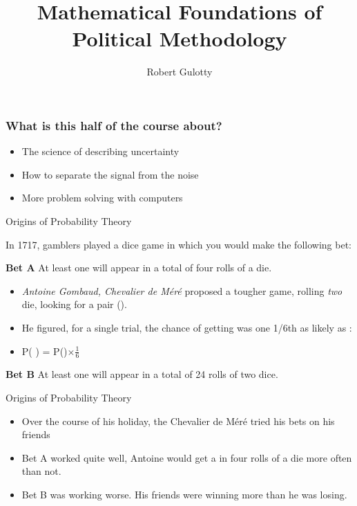 \documentclass[handout]{beamer}
\title[PLSC 43401]{Mathematical Foundations of Political Methodology}
\author{Robert Gulotty}
\institute[Chicago]{University of Chicago}
\def\die#1{{\domino#1}}
\numberwithin{equation}{section}
\begin{document}
\begin{frame}
\maketitle
\end{frame}
\begin{frame}
\frametitle{What is this half of the course about?}
\begin{itemize}
\item The science of describing uncertainty
\item How to separate the signal from the noise
\item More problem solving with computers
\end{itemize}
\end{frame}






\begin{frame}{Origins of Probability Theory}

In 1717, gamblers played a dice game in which you would make the following bet:
\begin{tcolorbox}
\textbf{Bet A} At least one \die1 will appear in a total of four rolls of a die.\\
\end{tcolorbox}
\pause
\begin{itemize}
\item \emph{Antoine Gombaud, Chevalier de M\'{e}r\'{e}} proposed a tougher game, rolling \emph{two} die, looking for a pair (\die1\die1).\\
\pause
\item He figured, for a single trial, the chance of getting \die1\die1 was one 1/6th as likely as \die1 : \pause
\item[$\rightarrow$] P( \die1\die1) =  P(\die1)$\times\frac{1}{6}$
\pause
  
\end{itemize}
\begin{tcolorbox}
\textbf{Bet B}  At least one \die1\die1 will appear in a total of 24 rolls of two dice.
\end{tcolorbox}
\end{frame}

\begin{frame}{Origins of Probability Theory}

\begin{itemize}
\item Over the course of his holiday, the Chevalier de M\'{e}r\'{e} tried his bets on his friends 
\item Bet A worked quite well, Antoine would get a \die1 in four rolls of a die more often than not. \pause
\item Bet B was working worse. His friends were winning more than he was losing.
\end{itemize}
\end{frame}
\end{document}
